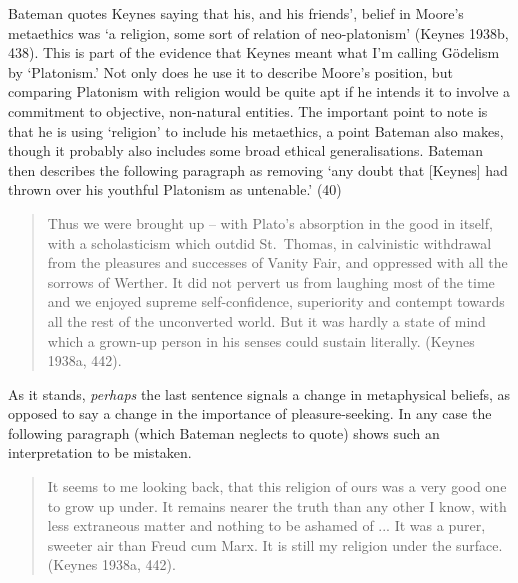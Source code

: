\documentclass[noflushend]{philosophersimprint}
\begin{document}
Bateman quotes Keynes saying that his, and his friends', belief in
Moore's metaethics was `a religion, some sort of relation of
neo-platonism' (Keynes 1938b, 438). This is part of the evidence that
Keynes meant what I'm calling Gödelism by `Platonism.' Not only does he
use it to describe Moore's position, but comparing Platonism with
religion would be quite apt if he intends it to involve a commitment to
objective, non-natural entities. The important point to note is that he
is using `religion' to include his metaethics, a point Bateman also
makes, though it probably also includes some broad ethical
generalisations. Bateman then describes the following paragraph as
removing `any doubt that {[}Keynes{]} had thrown over his youthful
Platonism as untenable.' (40)

\begin{quote}
Thus we were brought up -- with Plato's absorption in the good in
itself, with a scholasticism which outdid St.~Thomas, in calvinistic
withdrawal from the pleasures and successes of Vanity Fair, and
oppressed with all the sorrows of Werther. It did not pervert us from
laughing most of the time and we enjoyed supreme self-confidence,
superiority and contempt towards all the rest of the unconverted world.
But it was hardly a state of mind which a grown-up person in his senses
could sustain literally. (Keynes 1938a, 442).
\end{quote}

As it stands, \emph{perhaps} the last sentence signals a change in
metaphysical beliefs, as opposed to say a change in the importance of
pleasure-seeking. In any case the following paragraph (which Bateman
neglects to quote) shows such an interpretation to be mistaken.

\begin{quote}
It seems to me looking back, that this religion of ours was a very good
one to grow up under. It remains nearer the truth than any other I know,
with less extraneous matter and nothing to be ashamed of ... It was a
purer, sweeter air than Freud cum Marx. It is still my religion under
the surface. (Keynes 1938a, 442).
\end{quote}
\end{document}

